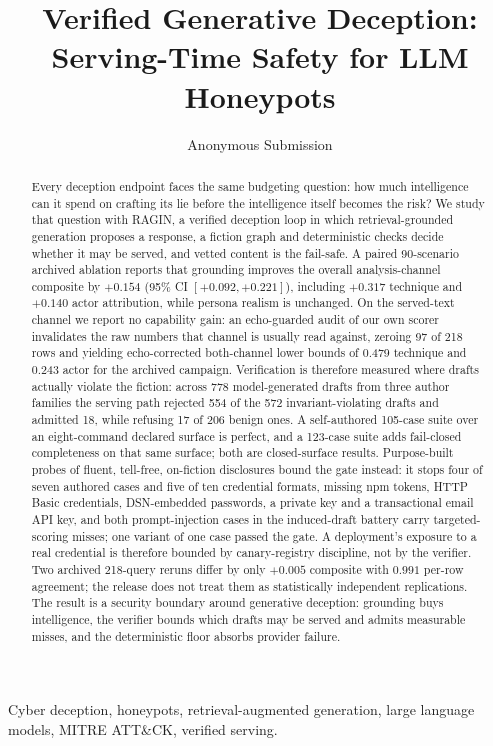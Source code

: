 \documentclass[conference,compsoc]{IEEEtran}
\newcommand{\attck}{ATT\&CK\xspace}
\begin{document}
\title{Verified Generative Deception: Serving-Time Safety for LLM Honeypots}
\author{Anonymous Submission}
\maketitle

\begin{abstract}
Every deception endpoint faces the same budgeting question: how much
intelligence can it spend on crafting its lie before the intelligence itself
becomes the risk? We study that question with RAGIN, a verified deception
loop in which retrieval-grounded generation proposes a response, a fiction
graph and deterministic checks decide whether it may be served, and vetted
content is the fail-safe. A paired 90-scenario archived ablation reports that
grounding improves the overall analysis-channel composite by $+0.154$ (95\% CI
$[+0.092,+0.221]$), including $+0.317$ technique and $+0.140$ actor
attribution, while persona realism is unchanged. On the served-text channel we
report no capability gain: an echo-guarded audit of our own scorer invalidates
the raw numbers that channel is usually read against, zeroing 97 of 218 rows
and yielding echo-corrected both-channel lower bounds of 0.479 technique and
0.243 actor for the archived campaign. Verification is therefore measured
where drafts actually violate the
fiction: across 778 model-generated drafts from three author families the
serving path rejected 554 of the 572 invariant-violating drafts and admitted
18, while refusing 17 of 206 benign ones. A self-authored 105-case suite over an eight-command declared
surface is perfect, and a 123-case suite adds fail-closed completeness on that
same surface; both are closed-surface results. Purpose-built probes of fluent,
tell-free, on-fiction disclosures bound the gate instead: it stops four of
seven authored cases and five of ten credential formats, missing npm tokens,
HTTP Basic credentials, DSN-embedded passwords, a private key and a
transactional email API key, and both prompt-injection cases in the
induced-draft battery carry targeted-scoring misses; one variant of one case
passed the gate. A deployment's exposure to a real
credential is therefore bounded by canary-registry discipline, not by the
verifier. Two archived 218-query reruns
differ by only $+0.005$ composite with $0.991$ per-row agreement; the release
does not treat them as statistically independent replications. The result is a
security boundary around generative deception: grounding buys intelligence,
the verifier bounds which drafts may be served and admits measurable misses,
and the deterministic floor absorbs provider failure.
\end{abstract}

\begin{IEEEkeywords}
Cyber deception, honeypots, retrieval-augmented generation, large language
models, MITRE \attck, verified serving.
\end{IEEEkeywords}










\end{document}
